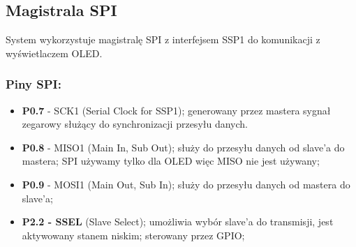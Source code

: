 \subsection{Magistrala SPI}
System wykorzystuje magistralę SPI z interfejsem SSP1 do komunikacji z wyświetlaczem OLED. 
\subsubsection{Piny SPI:}
\begin{itemize}
\item \textbf{P0.7} - SCK1 (Serial Clock for SSP1); generowany przez mastera sygnał zegarowy służący do synchronizacji przesyłu danych.
\item \textbf{P0.8} - MISO1 (Main In, Sub Out); służy do przesyłu danych od slave'a do mastera; SPI używamy tylko dla OLED więc MISO nie jest używany;
\item \textbf{P0.9} - MOSI1 (Main Out, Sub In); służy do przesyłu danych od mastera do slave'a;
\item \textbf{P2.2 - SSEL} (Slave Select); umożliwia wybór slave’a do transmisji, jest aktywowany stanem niskim; sterowany przez GPIO;
\end{itemize}
